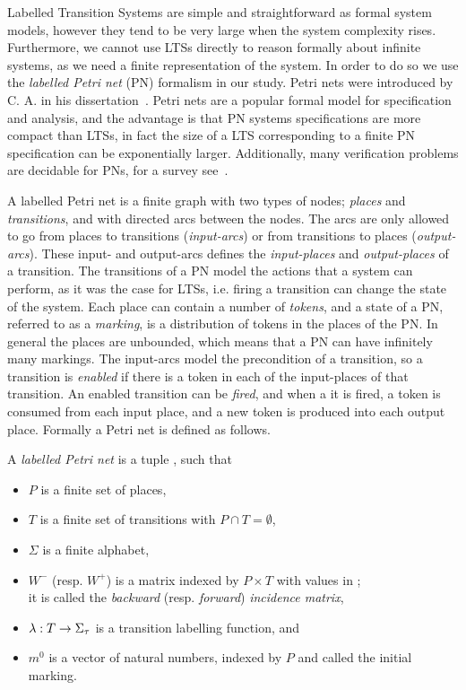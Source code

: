 Labelled Transition Systems are simple and straightforward as formal system models, however they tend to be very large when the system complexity rises. Furthermore, we cannot use LTSs directly to reason formally about infinite systems, as we need a finite representation of the system. In order to do so we use the \emph{labelled Petri net} (PN) formalism in our study. Petri nets were introduced by C. A. \citeauthor{phd-petri} in his dissertation~\cite{phd-petri}.
Petri nets are a popular formal model for specification and analysis, and the advantage is that PN systems specifications are more compact than LTSs, in fact the size of a LTS corresponding to a finite PN specification can be exponentially larger. Additionally, many verification problems are decidable for PNs, for a survey see~\cite{DBLP:journals/eatcs/EsparzaN94}.

A labelled Petri net is a finite graph with two types of nodes; \emph{places} and \emph{transitions}, and with directed arcs between the nodes. The arcs are only allowed to go from places to transitions (\emph{input-arcs}) or from transitions to places (\emph{output-arcs}). These input- and output-arcs defines the \emph{input-places} and \emph{output-places} of a transition. The transitions of a PN model the actions that a system can perform, as it was the case for LTSs, i.e. firing a transition can change the state of the system. Each place can contain a number of \emph{tokens}, and a state of a PN, referred to as a \emph{marking}, is a distribution of tokens in the places of the PN. In general the places are unbounded, which means that a PN can have infinitely many markings.  
The input-arcs model the precondition of a transition, so a transition is \emph{enabled} if there is a token in each of the {input-places} of that transition. An enabled transition can be \emph{fired}, and when a it is fired, a token is consumed from each input place, and a new token is produced into each output place. Formally a Petri net is defined as follows.
\begin{definition}\label{def:intro:pn}
A \emph{labelled Petri net} is a tuple \pndef, such that
\begin{itemize}
    \item $P$ is a finite set of places,
    \item $T$ is a finite set of transitions with $P \cap T = \emptyset$,
    \item $\Sigma$ is a finite alphabet,
    \item $W^-$ (resp. $W^+$) is a matrix indexed by $P\times T$ with values in \N;\\ it is called the \emph{backward} (resp. \emph{forward}) \emph{incidence matrix},
    \item $\lambda : T \rightarrow \Sigma_\tau$ is a transition labelling function, and
    \item $m^0$ is a vector of natural numbers, indexed by $P$ and called the initial marking.
\end{itemize}     
\end{definition}


